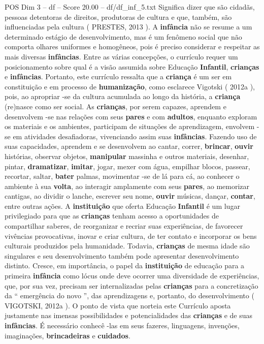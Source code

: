 \begin{textsample}{POS Dim 3 – df – Score 20.00 – df/df\_inf\_5.txt}
Significa dizer que são cidadãs, pessoas detentoras de direitos, produtoras de cultura e que, também, são influenciadas pela cultura ( PRESTES, 2013 ).
A \textbf{infância} não se resume a um determinado estágio de desenvolvimento, mas é um fenômeno social que não comporta olhares uniformes e homogêneos, pois é preciso considerar e respeitar as mais diversas \textbf{infâncias}.
Entre as várias concepções, o currículo requer um posicionamento sobre qual é a visão assumida sobre Educação \textbf{Infantil}, \textbf{crianças} e \textbf{infâncias}.
Portanto, este currículo ressalta que a \textbf{criança} é um ser em constituição e em processo de \textbf{humanização}, como esclarece Vigotski ( 2012a ), pois, ao apropriar -se da cultura acumulada ao longo da história, a \textbf{criança} (re)nasce como ser social.
As \textbf{crianças}, por serem capazes, aprendem e desenvolvem -se nas relações com seus \textbf{pares} e com \textbf{adultos}, enquanto exploram os materiais e os ambientes, participam de situações de aprendizagem, envolvem -se em atividades desafiadoras, vivenciando assim suas \textbf{infâncias}.
Fazendo uso de suas capacidades, aprendem e se desenvolvem ao cantar, correr, \textbf{brincar}, \textbf{ouvir} histórias, observar objetos, \textbf{manipular} massinha e outros materiais, desenhar, pintar, \textbf{dramatizar}, \textbf{imitar}, jogar, mexer com água, empilhar blocos, passear, recortar, saltar, \textbf{bater} palmas, movimentar -se de lá para cá, ao conhecer o ambiente à sua \textbf{volta}, ao interagir amplamente com seus \textbf{pares}, ao memorizar cantigas, ao dividir o lanche, escrever seu nome, \textbf{ouvir} músicas, dançar, \textbf{contar}, entre outras ações.
A \textbf{instituição} que oferta Educação \textbf{Infantil} é um lugar privilegiado para que as \textbf{crianças} tenham acesso a oportunidades de compartilhar saberes, de reorganizar e recriar suas experiências, de favorecer vivências provocativas, inovar e criar cultura, de ter contato e incorporar os bens culturais produzidos pela humanidade.
Todavia, \textbf{crianças} de mesma idade são singulares e seu desenvolvimento também pode apresentar desenvolvimento distinto.
Cresce, em importância, o papel da \textbf{instituição} de educação para a primeira \textbf{infância} como lócus onde deve ocorrer uma diversidade de experiências, que, por sua vez, precisam ser internalizadas pelas \textbf{crianças} para a concretização da “ emergência do novo ”, das aprendizagens e, portanto, do desenvolvimento ( VIGOTSKI, 2012a ).
O ponto de vista que norteia este Currículo aposta justamente nas imensas possibilidades e potencialidades das \textbf{crianças} e de suas \textbf{infâncias}.
É necessário conhecê -las em seus fazeres, linguagens, invenções, imaginações, \textbf{brincadeiras} e \textbf{cuidados}.

\end{textsample}
